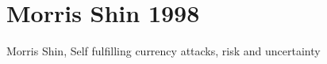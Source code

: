\documentclass[draft.tex]{subfiles}
\begin{document}
\chapter{Morris Shin 1998}
Morris Shin, Self fulfilling currency attacks, risk and uncertainty
\parencite{morris1998unique}
\end{document}
